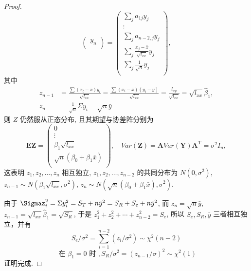 \begin{proof}
\begin{equation*}
\begin{pmatrix}
y_n\\
\end{pmatrix}
=
\begin{pmatrix}
\sum_j{a}_{1j} y_{j}\\
\vdots\\
\displaystyle\sum_j{a}_{n-2, j} y_j\\
\displaystyle\sum_j{\frac{x_j-\bar{x}}{\sqrt{l_{xx}}}} y_j\\
\displaystyle\sum_j{\frac{1}{\sqrt{n}}} y_j\\
\end{pmatrix},
\end{equation*}
其中
\begin{equation*}
\begin{split}
z_{n-1} & = \frac{\sum(x_{t}-\bar{x}) y_{i}}{\sqrt{l_{x x}}} = 
\frac{\sum(x_{i}-\bar{x})(y_{i}-\bar{y})}{\sqrt{l_{x x}}} = 
\frac{l_{x y}}{\sqrt{l_{x x}}} =
\sqrt{l_{x x}} \hat{\beta}_{1}, \\ 
z_{n} & =\frac{1}{\sqrt{n}} \Sigma y_{i}=\sqrt{n} \bar{y}
\end{split}
\end{equation*}
则 ${Z}$ 仍然服从正态分布, 且其期望与协差阵分别为
\begin{equation*}
\mathbf{EZ} = 
  \begin{pmatrix}
    0      \\
    \vdots \\
    \beta_{1}\sqrt{l_{xx}} \\
    \sqrt{n}(\beta_{0} + \beta_{1} \bar{x}) \\
  \end{pmatrix},
  \quad
  Var(\mathbf{Z}) = \mathbf{A} Var(\mathbf{Y}) \mathbf{A}^{\mathrm{T}} = \sigma^{2} I_{n}, 
\end{equation*}
这表明 $z_1, z_2, \ldots, z_n$ 相互独立, $z_1, z_2, \ldots, z_{n-2}$ 的共同分布为 $N(0, \sigma^2)$, $z_{n-1} \sim N(\beta_{1} \sqrt{l_{xx}}, \sigma^2)$, $z_{n} \sim N(\sqrt{n} (\beta_0 + \beta_{1} \bar{x}), \sigma^{2})$.

由于 $\Sigmaz_{i}^{2} = \Sigma y_{i}^{2} = S_{T} + n \bar{y}^2 = S_{R} + S_{e} + n \bar{y}^2$, 而 $z_n = \sqrt{n} \bar{y}$, $z_{n-1} = \sqrt{l_{xx}}\hat{\beta}_{1} = \sqrt{S_{R}}$, 于是 $z_{1}^2 + z_{2}^2 + \cdots + z_{n-2}^2 = S_{e}$, 所以 $S_{e}, S_{R}, \bar{y}$ 三者相互独立，并有
\begin{equation*}
S_{e} / \sigma^{2}=\sum_{i=1}^{n-2}\left(z_{i} / \sigma^{2}\right) \sim \chi^{2}(n-2)
\end{equation*}
\begin{equation*}
\text{ 在 }\beta_{1}=0 \text { 时 }, S_{R} / \sigma^{2}=\left(z_{n-1} / \sigma\right)^{2} \sim \chi^{2}(1)
\end{equation*}
证明完成.
\end{proof}

